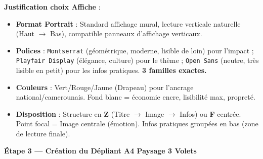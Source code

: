 \documentclass[11pt]{article}
\begin{document}
\begin{exoresolu}
\textbf{Justification choix Affiche} :
\begin{itemize}
    \item \textbf{Format Portrait} : Standard affichage mural, lecture verticale naturelle (Haut $\rightarrow$ Bas), compatible panneaux d'affichage verticaux.
    \item \textbf{Polices} : \texttt{Montserrat} (géométrique, moderne, lisible de loin) pour l'impact ; \texttt{Playfair Display} (élégance, culture) pour le thème ; \texttt{Open Sans} (neutre, très lisible en petit) pour les infos pratiques. \textbf{3 familles exactes.}
    \item \textbf{Couleurs} : Vert/Rouge/Jaune (Drapeau) pour l'ancrage national/camerounais. Fond blanc = économie encre, lisibilité max, propreté.
    \item \textbf{Disposition} : Structure en \textbf{Z} (Titre $\rightarrow$ Image $\rightarrow$ Infos) ou \textbf{F} centrée. Point focal = Image centrale (émotion). Infos pratiques groupées en bas (zone de lecture finale).
\end{itemize}

\textbf{Étape 3 — Création du Dépliant A4 Paysage 3 Volets}


\end{exoresolu}
\end{document}
